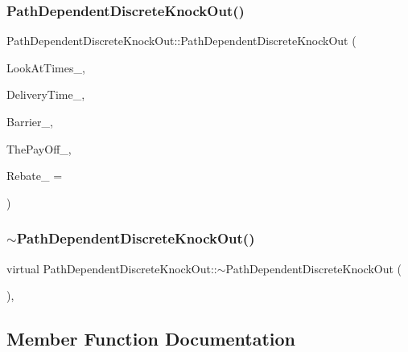 \subsubsection{\texorpdfstring{Path\+Dependent\+Discrete\+Knock\+Out()}{PathDependentDiscreteKnockOut()}}
{\footnotesize\ttfamily Path\+Dependent\+Discrete\+Knock\+Out\+::\+Path\+Dependent\+Discrete\+Knock\+Out (\begin{DoxyParamCaption}\item[{const \hyperlink{classMJArray}{M\+J\+Array} \&}]{Look\+At\+Times\+\_\+,  }\item[{double}]{Delivery\+Time\+\_\+,  }\item[{double}]{Barrier\+\_\+,  }\item[{const \hyperlink{classPayOffBridge}{Pay\+Off\+Bridge} \&}]{The\+Pay\+Off\+\_\+,  }\item[{double}]{Rebate\+\_\+ = {} }\end{DoxyParamCaption})}

\hypertarget{classPathDependentDiscreteKnockOut_a9d72012bdfff7b91e9446ede2faeab27}{}\label{classPathDependentDiscreteKnockOut_a9d72012bdfff7b91e9446ede2faeab27} 
\subsubsection{\texorpdfstring{$\sim$\+Path\+Dependent\+Discrete\+Knock\+Out()}{~PathDependentDiscreteKnockOut()}}
{\footnotesize\ttfamily virtual Path\+Dependent\+Discrete\+Knock\+Out\+::$\sim$\+Path\+Dependent\+Discrete\+Knock\+Out (\begin{DoxyParamCaption}{ }\end{DoxyParamCaption})\hspace{0.3cm}{\ttfamily [inline]}, {\ttfamily [virtual]}}



\subsection{Member Function Documentation}
\hypertarget{classPathDependentDiscreteKnockOut_a7417c5e52e5f9140f1616fd5019a9eb3}{}\label{classPathDependentDiscreteKnockOut_a7417c5e52e5f9140f1616fd5019a9eb3} 
